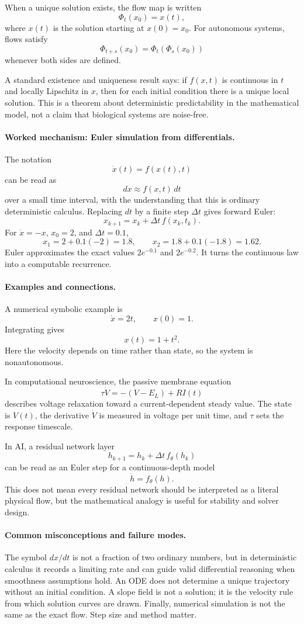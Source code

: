 When a unique solution exists, the flow map is written
\[
\Phi_t(x_0)=x(t),
\]
where \(x(t)\) is the solution starting at \(x(0)=x_0\). For autonomous systems, flows satisfy
\[
\Phi_{t+s}(x_0)=\Phi_t(\Phi_s(x_0))
\]
whenever both sides are defined.

A standard existence and uniqueness result says: if \(f(x,t)\) is continuous in \(t\) and locally Lipschitz in \(x\), then for each initial condition there is a unique local solution. This is a theorem about deterministic predictability in the mathematical model, not a claim that biological systems are noise-free.

\paragraph{Worked mechanism: Euler simulation from differentials.}
The notation
\[
\dot x(t)=f(x(t),t)
\]
can be read as
\[
dx\approx f(x,t)\,dt
\]
over a small time interval, with the understanding that this is ordinary deterministic calculus. Replacing \(dt\) by a finite step \(\Delta t\) gives forward Euler:
\[
x_{k+1}=x_k+\Delta t\,f(x_k,t_k).
\]
For \(\dot x=-x\), \(x_0=2\), and \(\Delta t=0.1\),
\[
x_1=2+0.1(-2)=1.8,\qquad
x_2=1.8+0.1(-1.8)=1.62.
\]
Euler approximates the exact values \(2e^{-0.1}\) and \(2e^{-0.2}\). It turns the continuous law into a computable recurrence.

\paragraph{Examples and connections.}
A numerical symbolic example is
\[
\dot x=2t,\qquad x(0)=1.
\]
Integrating gives
\[
x(t)=1+t^2.
\]
Here the velocity depends on time rather than state, so the system is nonautonomous.

In computational neuroscience, the passive membrane equation
\[
\tau \dot V=-(V-E_L)+RI(t)
\]
describes voltage relaxation toward a current-dependent steady value. The state is \(V(t)\), the derivative \(\dot V\) is measured in voltage per unit time, and \(\tau\) sets the response timescale.

In AI, a residual network layer
\[
h_{k+1}=h_k+\Delta t\,f_\theta(h_k)
\]
can be read as an Euler step for a continuous-depth model
\[
\dot h=f_\theta(h).
\]
This does not mean every residual network should be interpreted as a literal physical flow, but the mathematical analogy is useful for stability and solver design.

\paragraph{Common misconceptions and failure modes.}
The symbol \(dx/dt\) is not a fraction of two ordinary numbers, but in deterministic calculus it records a limiting rate and can guide valid differential reasoning when smoothness assumptions hold. An ODE does not determine a unique trajectory without an initial condition. A slope field is not a solution; it is the velocity rule from which solution curves are drawn. Finally, numerical simulation is not the same as the exact flow. Step size and method matter.

